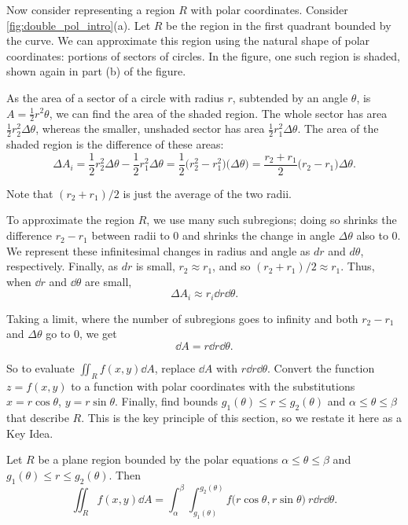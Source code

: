 Now consider representing a region $R$ with polar coordinates. Consider \autoref{fig:double_pol_intro}(a). Let $R$ be the region in the first quadrant bounded by the curve. We can approximate this region using the natural shape of polar coordinates: portions of sectors of circles. In the figure, one such region is shaded, shown again in part (b) of the figure.

As the area of a sector of a circle with radius $r$, subtended by an angle $\theta$, is $A = \frac12r^2\theta$, we can find the area of the shaded region. The whole sector has area $\frac12r_2^2\Delta \theta$, whereas the smaller, unshaded sector has area $\frac12r_1^2\Delta \theta$. The area of the shaded region is the difference of these areas:
\[\Delta A_i = \frac12r_2^2\Delta\theta-\frac12r_1^2\Delta\theta = \frac12\bigl(r_2^2-r_1^2\bigr)\bigl(\Delta\theta\bigr) = \frac{r_2+r_1}{2}\bigl(r_2-r_1\bigr)\Delta\theta.\]

Note that $(r_2+r_1)/2$ is just the average of the two radii. 

To approximate the region $R$, we use many such subregions; doing so shrinks the difference $r_2-r_1$ between radii to 0 and shrinks the change in angle $\Delta \theta$ also to 0. We represent these infinitesimal changes in radius and angle as $dr$ and $d\theta$, respectively. Finally, as $dr$ is small, $r_2\approx r_1$, and so $(r_2+r_1)/2\approx r_1$. Thus, when $\dd r$ and $\dd\theta$ are small, 
\[\Delta A_i \approx r_i\dd r\dd\theta.\]

Taking a limit, where the number of subregions goes to infinity and both $r_2-r_1$ and $\Delta\theta$ go to 0, we get \[\dd A = r\dd r\dd\theta.\]

So to evaluate $\iint_Rf(x,y)\dd A$, replace $\dd A$ with $r\dd r\dd\theta$. Convert the function $z=f(x,y)$ to a function with polar coordinates with the substitutions $x=r\cos\theta$, $y=r\sin\theta$. Finally, find bounds $g_1(\theta)\leq r\leq g_2(\theta)$ and $\alpha\leq\theta\leq\beta$ that describe $R$. This is the key principle of this section, so we restate it here as a Key Idea.

{
\begin{keyidea}\label{idea:doublepol}
Let $R$ be a plane region bounded by the polar equations $\alpha\leq\theta\leq\beta$ and  $g_1(\theta)\leq r\leq g_2(\theta)$. Then
\[\iint_Rf(x,y)\dd A = \int_\alpha^\beta\int_{g_1(\theta)}^{g_2(\theta)} f\bigl(r\cos\theta,r\sin\theta\bigr)\ r\dd r\dd\theta.\]
\end{keyidea}}


